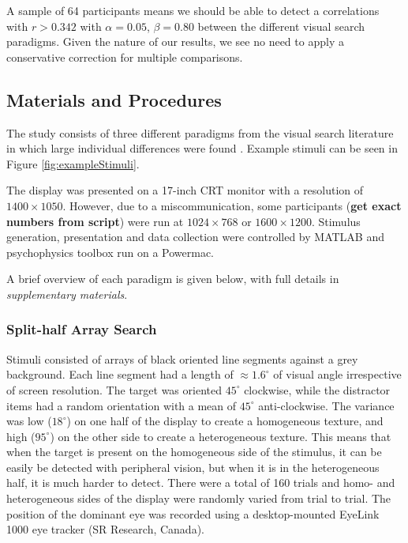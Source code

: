\documentclass[]{rsos}%
\begin{document}
A sample of 64 participants means we should be able to detect a correlations with $r > 0.342$ with $\alpha = 0.05$, $\beta = 0.80$ between the different visual search paradigms. Given the nature of our results, we see no need to apply a conservative correction for multiple comparisons. 

\subsection{Materials and Procedures}

The study consists of three different paradigms from the visual search literature in which large individual differences were found \cite{nowakowsak2017, irons-leber2016, kristjansson2014}. Example stimuli can be seen in Figure \ref{fig:exampleStimuli}.



The display was presented on a 17-inch CRT monitor with a resolution of $1400 \times 
1050$. However, due to a miscommunication, some participants (\textbf{get exact numbers from script}) were run at $1024 \times 768$ or $1600 \times 1200$. Stimulus generation, presentation and data collection were controlled by MATLAB and psychophysics toolbox \cite{brainard1997} run on a Powermac. 

A brief overview of each paradigm is given below, with full details in \textit{supplementary materials}. 

\subsubsection{Split-half Array Search}

Stimuli consisted of arrays of black oriented line segments against a grey background. Each line segment had a length of $\approx$$1.6^{\circ}$ of visual angle irrespective of screen resolution. The target was oriented $45^{\circ}$ clockwise, while the distractor items had a random orientation with a mean of $45^{\circ}$ anti-clockwise. The variance was low ($18^{\circ}$) on one half of the display to create a homogeneous texture, and high ($95^{\circ}$) on the other side to create a heterogeneous texture. This means that when the target is present on the homogeneous side of the stimulus, it can be easily be detected with peripheral vision, but when it is in the heterogeneous half, it is much harder to detect. There were a total of 160 trials and homo- and heterogeneous sides of the display were randomly varied from trial to trial. The position of the dominant eye was recorded using a desktop-mounted EyeLink 1000 eye tracker (SR Research, Canada). 
\end{document}
